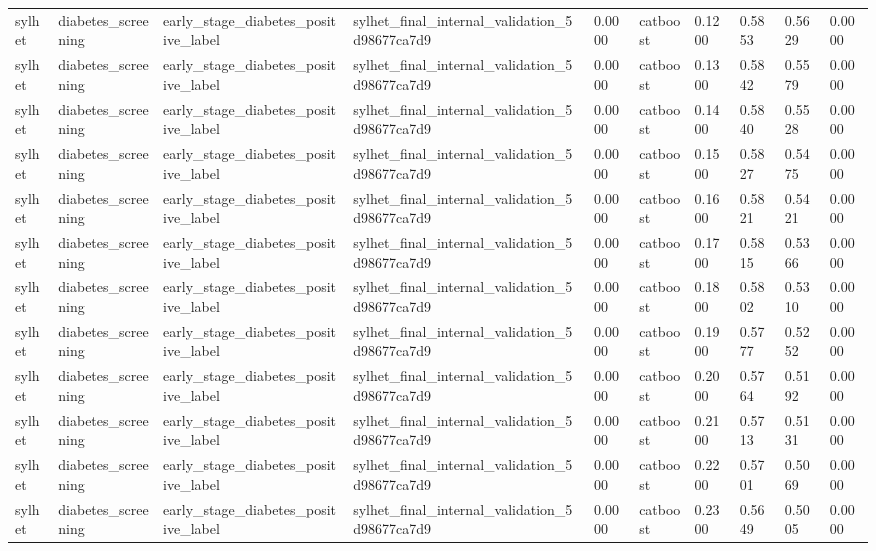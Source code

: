 \begin{tabular}{llllllllll}
sylhet & diabetes\_screening & early\_stage\_diabetes\_positive\_label & sylhet\_final\_internal\_validation\_5d98677ca7d9 & 0.0000 & catboost & 0.1200 & 0.5853 & 0.5629 & 0.0000 \\
sylhet & diabetes\_screening & early\_stage\_diabetes\_positive\_label & sylhet\_final\_internal\_validation\_5d98677ca7d9 & 0.0000 & catboost & 0.1300 & 0.5842 & 0.5579 & 0.0000 \\
sylhet & diabetes\_screening & early\_stage\_diabetes\_positive\_label & sylhet\_final\_internal\_validation\_5d98677ca7d9 & 0.0000 & catboost & 0.1400 & 0.5840 & 0.5528 & 0.0000 \\
sylhet & diabetes\_screening & early\_stage\_diabetes\_positive\_label & sylhet\_final\_internal\_validation\_5d98677ca7d9 & 0.0000 & catboost & 0.1500 & 0.5827 & 0.5475 & 0.0000 \\
sylhet & diabetes\_screening & early\_stage\_diabetes\_positive\_label & sylhet\_final\_internal\_validation\_5d98677ca7d9 & 0.0000 & catboost & 0.1600 & 0.5821 & 0.5421 & 0.0000 \\
sylhet & diabetes\_screening & early\_stage\_diabetes\_positive\_label & sylhet\_final\_internal\_validation\_5d98677ca7d9 & 0.0000 & catboost & 0.1700 & 0.5815 & 0.5366 & 0.0000 \\
sylhet & diabetes\_screening & early\_stage\_diabetes\_positive\_label & sylhet\_final\_internal\_validation\_5d98677ca7d9 & 0.0000 & catboost & 0.1800 & 0.5802 & 0.5310 & 0.0000 \\
sylhet & diabetes\_screening & early\_stage\_diabetes\_positive\_label & sylhet\_final\_internal\_validation\_5d98677ca7d9 & 0.0000 & catboost & 0.1900 & 0.5777 & 0.5252 & 0.0000 \\
sylhet & diabetes\_screening & early\_stage\_diabetes\_positive\_label & sylhet\_final\_internal\_validation\_5d98677ca7d9 & 0.0000 & catboost & 0.2000 & 0.5764 & 0.5192 & 0.0000 \\
sylhet & diabetes\_screening & early\_stage\_diabetes\_positive\_label & sylhet\_final\_internal\_validation\_5d98677ca7d9 & 0.0000 & catboost & 0.2100 & 0.5713 & 0.5131 & 0.0000 \\
sylhet & diabetes\_screening & early\_stage\_diabetes\_positive\_label & sylhet\_final\_internal\_validation\_5d98677ca7d9 & 0.0000 & catboost & 0.2200 & 0.5701 & 0.5069 & 0.0000 \\
sylhet & diabetes\_screening & early\_stage\_diabetes\_positive\_label & sylhet\_final\_internal\_validation\_5d98677ca7d9 & 0.0000 & catboost & 0.2300 & 0.5649 & 0.5005 & 0.0000 \\

\end{tabular}

